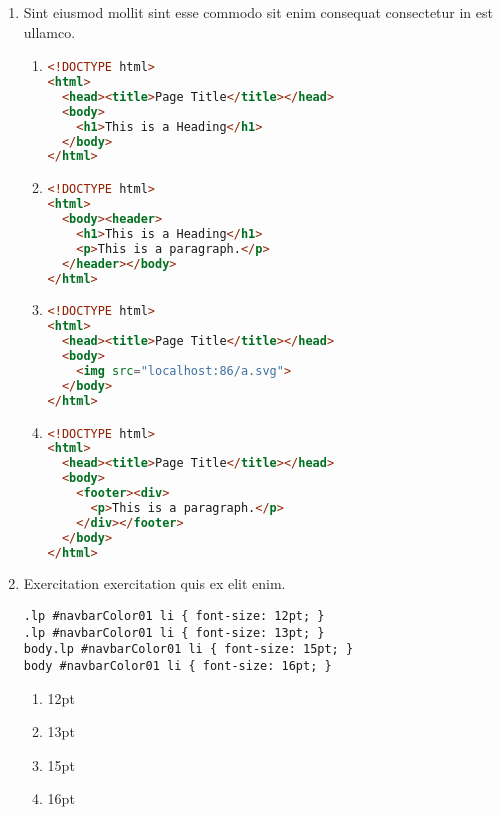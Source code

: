 \documentclass[a4paper,12pt]{article}
\begin{document}
\begin{enumerate}[label=\textbf{\arabic*.}]
\begin{enumerate}
  \end{enumerate}
  \item Sint eiusmod mollit sint esse commodo sit enim consequat consectetur in est ullamco.
  \begin{enumerate}
    \item \hfill \vspace*{-7mm}
    \begin{lstlisting}[language=HTML]
<!DOCTYPE html>
<html>
  <head><title>Page Title</title></head>
  <body>
    <h1>This is a Heading</h1>
  </body>
</html>
    \end{lstlisting}
    \item \hfill \vspace*{-7mm}
    \begin{lstlisting}[language=HTML]
<!DOCTYPE html> 
<html>
  <body><header>
    <h1>This is a Heading</h1>
    <p>This is a paragraph.</p>
  </header></body>
</html>
    \end{lstlisting}
    \item \hfill \vspace*{-7mm}
    \begin{lstlisting}[language=HTML]
<!DOCTYPE html>
<html>
  <head><title>Page Title</title></head>
  <body>
    <img src="localhost:86/a.svg">
  </body>
</html>
    \end{lstlisting}
    \item \hfill \vspace*{-7mm}
    \begin{lstlisting}[language=HTML]
<!DOCTYPE html>
<html>
  <head><title>Page Title</title></head>
  <body>
    <footer><div>
      <p>This is a paragraph.</p>
    </div></footer>
  </body>
</html>
    \end{lstlisting}
  \end{enumerate}
  \item Exercitation exercitation quis ex elit enim.
  
  \begin{minipage}{\textwidth} %
  \begin{lstlisting}
.lp #navbarColor01 li { font-size: 12pt; }
.lp #navbarColor01 li { font-size: 13pt; }
body.lp #navbarColor01 li { font-size: 15pt; }
body #navbarColor01 li { font-size: 16pt; }
  \end{lstlisting}
  \end{minipage}
  \begin{enumerate}
    \item 12pt
    \item 13pt
    \item 15pt
    \item 16pt
  \end{enumerate}
\end{enumerate}
\end{document}
